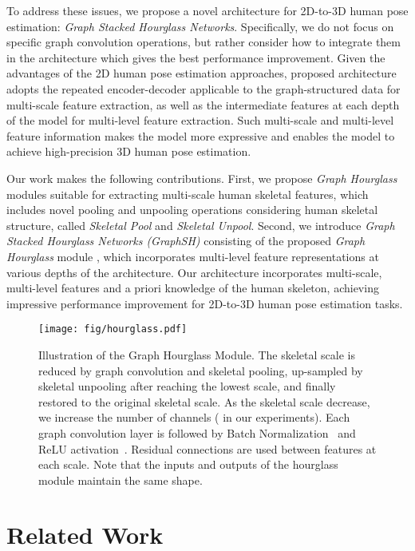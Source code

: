 \documentclass[final]{cvpr}
\begin{document}
To address these issues, we propose a novel architecture for 2D-to-3D human pose estimation: \textit{Graph Stacked Hourglass Networks}.
Specifically, we do not focus on specific graph convolution operations, but rather consider how to integrate them in the architecture which gives the best performance improvement. 
Given the advantages of the 2D human pose estimation approaches, proposed architecture adopts the repeated encoder-decoder applicable to the graph-structured data for multi-scale feature extraction, 
as well as the intermediate features at each depth of the model for multi-level feature extraction. 
Such multi-scale and multi-level feature information makes the model more expressive and enables the model to achieve high-precision 3D human pose estimation.

Our work makes the following contributions. 
First, we propose \textit{Graph Hourglass} modules suitable for extracting multi-scale human skeletal features, which includes novel pooling and unpooling operations considering human skeletal structure, called \textit{Skeletal Pool} and \textit{Skeletal Unpool}.
Second, we introduce \textit{Graph Stacked Hourglass Networks (GraphSH)} consisting of the proposed \textit{Graph Hourglass} module , which incorporates multi-level feature representations at various depths of the architecture.
Our architecture incorporates multi-scale, multi-level features and a priori knowledge of the human skeleton, achieving impressive performance improvement for 2D-to-3D human pose estimation tasks.

\begin{figure*}
\begin{center}
\texttt{[image: fig/hourglass.pdf]}
\end{center}
   \caption{Illustration of the Graph Hourglass Module. The skeletal scale is reduced by graph convolution and skeletal pooling, up-sampled by skeletal unpooling after reaching the lowest scale, 
   and finally restored to the original skeletal scale. As the skeletal scale decrease, we increase the number of channels ( in our experiments).
   Each graph convolution layer is followed by Batch Normalization~\cite{bn2015} and ReLU activation~\cite{relu2010}.
   Residual connections are used between features at each scale.
   Note that the inputs and outputs of the hourglass module maintain the same shape.}
\label{fig:hourglass}
\end{figure*}


\section{Related Work}\label{sec:related_work}
\end{document}
